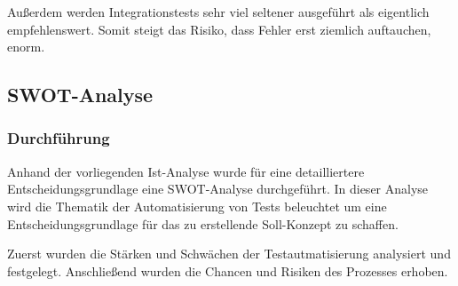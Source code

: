 Außerdem werden Integrationstests sehr viel seltener ausgeführt als eigentlich empfehlenswert. Somit steigt das Risiko, dass Fehler erst ziemlich auftauchen, enorm.  

\subsection{SWOT-Analyse}
\subsubsection{Durchführung}
Anhand der vorliegenden Ist-Analyse wurde für eine detailliertere Entscheidungsgrundlage eine SWOT-Analyse durchgeführt. In dieser Analyse wird die Thematik der Automatisierung von Tests beleuchtet um eine Entscheidungsgrundlage für das zu erstellende Soll-Konzept zu schaffen.

Zuerst wurden die Stärken und Schwächen der Testautmatisierung analysiert und festgelegt. Anschließend wurden die Chancen und Risiken des Prozesses erhoben. 

